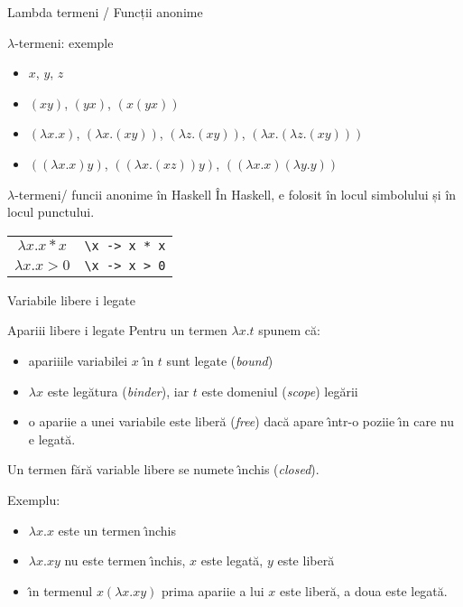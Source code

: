 \documentclass[xcolor=pdftex,romanian,colorlinks]{beamer}
\begin{document}
\begin{frame}[fragile]{ Lambda termeni / Funcții anonime}

\begin{block}{$\lambda$-termeni: exemple}
\begin{itemize}
\item $x$, $y$, $z$

\item  $(xy)$, $(yx)$, $(x(yx))$ 

\item $(\lambda x.x)$, $(\lambda x.(xy))$, $(\lambda z.(xy))$,
$(\lambda x.(\lambda z.(xy)))$ 
 

\item $((\lambda x. x)y)$, $((\lambda x.(xz))y)$, $((\lambda x. x)(\lambda y.y))$
\end{itemize}
\end{block}



\begin{block}{$\lambda$-termeni/ func\ts ii anonime în Haskell}
 În Haskell, \structure{\textbackslash} e folosit în locul simbolului \structure{$\lambda$} și
 \structure{\lstinline{->}} în locul punctului.

\begin{tabular}{c@{ este  }c}
$\lambda x. x * x$ & \texttt{\textbackslash x -> x * x}
\\
$\lambda x. x > 0$ & \texttt{\textbackslash x -> x > 0}
\end{tabular}
\end{block}
\end{frame}



\begin{frame}[fragile]{ Variabile libere \sh i legate}

\begin{block}{Apari\ts ii libere \sh i legate}
Pentru un termen $\lambda x.t$ spunem c\u a:
\begin{itemize}
\item apari\ts iile variabilei $x$ \^{\i}n $t$ sunt  legate ({\it bound})
\item $\lambda x$ este leg\u atura ({\it binder}), iar $t$ este domeniul ({\it scope}) leg\u arii
\item o apari\ts ie a unei variabile este liber\u a ({\it free}) dac\u a apare \^{\i}ntr-o pozi\ts ie \^{\i}n care nu e legat\u a.
\end{itemize}

Un termen f\u ar\u a variable libere se nume\sh te \^{\i}nchis ({\it closed}). 
\end{block}

Exemplu:
\begin{itemize}
\item $\lambda x. x$ este un termen \^{\i}nchis
\item $\lambda x. xy$ nu este termen \^{\i}nchis, $x$ este legat\u a, $y$ este liber\u a
\item \^{\i}n termenul $x (\lambda x. xy)$ prima apari\ts ie a lui $x$ este liber\u a, a doua este legat\u a. 
\end{itemize}
\end{frame}
\end{document}
